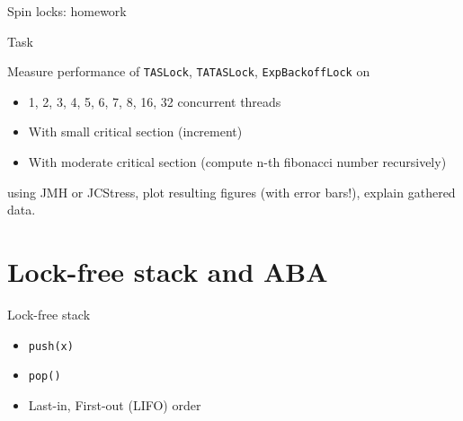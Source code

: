 \begin{frame}{Spin locks: homework}

\begin{homeworkmail}{Task~\taskSpinMeasure}{
    Measure performance of \texttt{TASLock}, \texttt{TATASLock}, \texttt{ExpBackoffLock} on
    \begin{itemize}
      \item 1, 2, 3, 4, 5, 6, 7, 8, 16, 32 concurrent threads
      \item With small critical section (increment)
      \item With moderate critical section (compute n-th fibonacci number recursively)
    \end{itemize}
    using JMH or JCStress, plot resulting figures (with error bars!), explain gathered data.
}
\end{homeworkmail}
\end{frame}

\section{Lock-free stack and ABA}
\showTOC

\begin{frame}{Lock-free stack}

\begin{itemize}
  \item \texttt{push(x)}
  \item \texttt{pop()}
  \item Last-in, First-out (LIFO) order
\end{itemize}

\end{frame}

